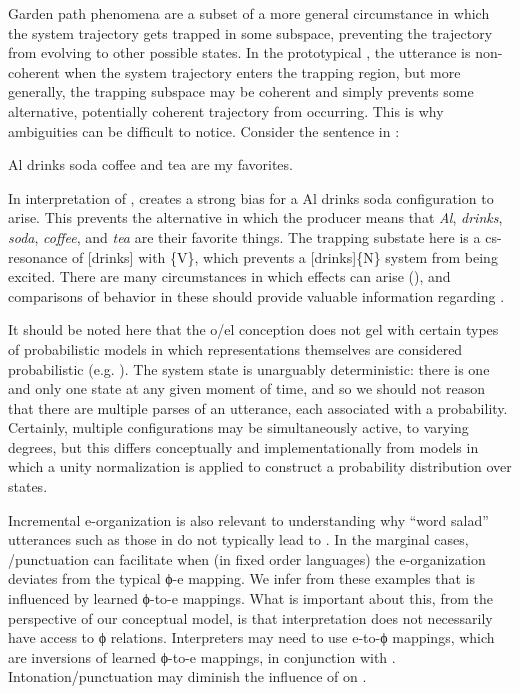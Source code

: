   Garden path phenomena are a subset of a more general circumstance in which the system trajectory gets trapped in some subspace, preventing the trajectory from evolving to other possible states. In the prototypical , the utterance is non-coherent when the system trajectory enters the trapping region, but more generally, the trapping subspace may be coherent and simply prevents some alternative, potentially coherent trajectory from occurring. This is why ambiguities can be difficult to notice. Consider the sentence in :

  \ea\label{ex:6:13}
    {Al drinks soda coffee and tea are my favorites.}
   \z
   
  In interpretation of ,  creates a strong bias for a {\textbar}Al drinks soda{\textbar} configuration to arise. This prevents the alternative  in which the producer means that \textit{Al}, \textit{drinks}, \textit{soda}, \textit{coffee}, and \textit{tea} are their favorite things. The trapping substate here is a cs-resonance of [drinks] with \{V\}, which prevents a [drinks]\{N\} system from being excited. There are many circumstances in which  effects can arise (\citealt{FFerreira2005,Pritchett1988}), and comparisons of behavior in these should provide valuable information regarding . 

  It should be noted here that the o/el conception does not gel with certain types of probabilistic models in which representations themselves are considered probabilistic (e.g. \citealt{ChaterManning2006,Manning2003}). The system state is unarguably deterministic: there is one and only one state at any given moment of time, and so we should not reason that there are multiple parses of an utterance, each associated with a probability. Certainly, multiple configurations may be simultaneously active, to varying degrees, but this differs conceptually and implementationally from models in which a unity normalization is applied to construct a probability distribution over states.

  Incremental e-or\-ga\-ni\-za\-tion is also relevant to understanding why “word salad” utterances such as those in  do not typically lead to . In the marginal cases, /punctuation can facilitate  when (in fixed order languages) the e-or\-ga\-ni\-za\-tion deviates from the typical ϕ-e mapping. We infer from these examples that  is influenced by learned ϕ-to-e mappings. What is important about this, from the perspective of our conceptual model, is that interpretation does not necessarily have access to ϕ relations. Interpreters may need to use e-to-ϕ mappings, which are inversions of learned ϕ-to-e mappings, in conjunction with . Intonation/punctuation may diminish the influence of  on . 

